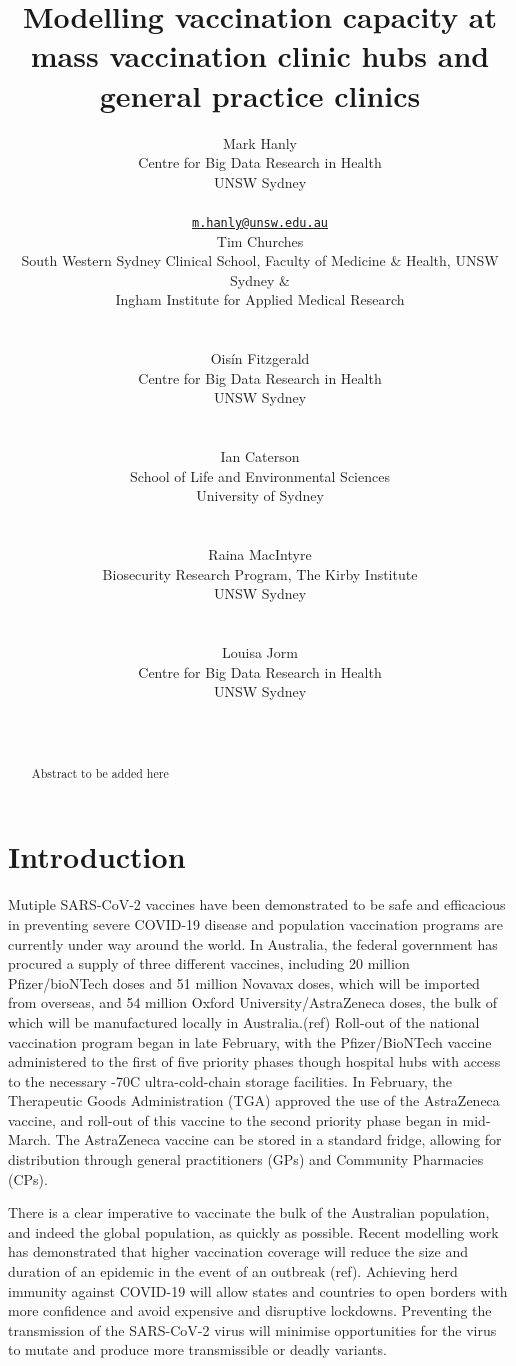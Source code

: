 \documentclass{article}
\title{Modelling vaccination capacity at mass vaccination clinic hubs and
general practice clinics}
\author{
    Mark Hanly
   \\
    Centre for Big Data Research in Health \\
    UNSW Sydney \\
   \\
  \texttt{\href{mailto:m.hanly@unsw.edu.au}{\nolinkurl{m.hanly@unsw.edu.au}}} \\
   \And
    Tim Churches
   \\
    South Western Sydney Clinical School, Faculty of Medicine \& Health,
  UNSW Sydney \& \\
    Ingham Institute for Applied Medical Research \\
   \\
  \texttt{} \\
   \And
    Oisín Fitzgerald
   \\
    Centre for Big Data Research in Health \\
    UNSW Sydney \\
   \\
  \texttt{} \\
   \And
    Ian Caterson
   \\
    School of Life and Environmental Sciences \\
    University of Sydney \\
   \\
  \texttt{} \\
   \And
    Raina MacIntyre
   \\
    Biosecurity Research Program, The Kirby Institute \\
    UNSW Sydney \\
   \\
  \texttt{} \\
   \And
    Louisa Jorm
   \\
    Centre for Big Data Research in Health \\
    UNSW Sydney \\
   \\
  \texttt{} \\
  }
\begin{document}
\maketitle

\def\tightlist{}


\begin{abstract}
Abstract to be added here
\end{abstract}


\newpage

\hypertarget{introduction}{%
\section{Introduction}\label{introduction}}

Mutiple SARS-CoV-2 vaccines have been demonstrated to be safe and
efficacious in preventing severe COVID-19 disease and population
vaccination programs are currently under way around the world. In
Australia, the federal government has procured a supply of three
different vaccines, including 20 million Pfizer/bioNTech doses and 51
million Novavax doses, which will be imported from overseas, and 54
million Oxford University/AstraZeneca doses, the bulk of which will be
manufactured locally in Australia.(ref) Roll-out of the national
vaccination program began in late February, with the Pfizer/BioNTech
vaccine administered to the first of five priority phases though
hospital hubs with access to the necessary -70\degree C ultra-cold-chain
storage facilities. In February, the Therapeutic Goods Administration
(TGA) approved the use of the AstraZeneca vaccine, and roll-out of this
vaccine to the second priority phase began in mid-March. The AstraZeneca
vaccine can be stored in a standard fridge, allowing for distribution
through general practitioners (GPs) and Community Pharmacies (CPs).

There is a clear imperative to vaccinate the bulk of the Australian
population, and indeed the global population, as quickly as possible.
Recent modelling work has demonstrated that higher vaccination coverage
will reduce the size and duration of an epidemic in the event of an
outbreak (ref). Achieving herd immunity against COVID-19 will allow
states and countries to open borders with more confidence and avoid
expensive and disruptive lockdowns. Preventing the transmission of the
SARS-CoV-2 virus will minimise opportunities for the virus to mutate and
produce more transmissible or deadly variants.
\end{document}
